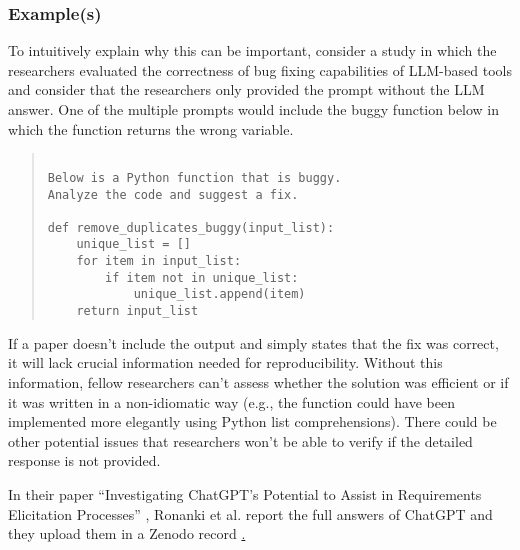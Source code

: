 

\subsubsection{Example(s)}

To intuitively explain why this can be important, consider a study in which the researchers evaluated the correctness of bug fixing capabilities of LLM-based tools and consider that the researchers only provided the prompt without the LLM answer. One of the multiple prompts would include the buggy function below in which the function returns the wrong variable. 

\begin{quote}
\begin{verbatim}

Below is a Python function that is buggy. 
Analyze the code and suggest a fix.

def remove_duplicates_buggy(input_list):
    unique_list = []
    for item in input_list:
        if item not in unique_list:
            unique_list.append(item)
    return input_list 

\end{verbatim}
\end{quote}

If a paper doesn't include the output and simply states that the fix was correct, it will lack crucial information needed for reproducibility. Without this information, fellow researchers can't assess whether the solution was efficient or if it was written in a non-idiomatic way (e.g., the function could have been implemented more elegantly using Python list comprehensions). There could be other potential issues that researchers won't be able to verify if the detailed response is not provided.


In their paper ``Investigating ChatGPT's Potential to Assist in Requirements Elicitation Processes'' \cite{ronanki2023investigating}, Ronanki et al. report the full answers of ChatGPT and they upload them in a Zenodo record \href{https://zenodo.org/records/8124936}. 

